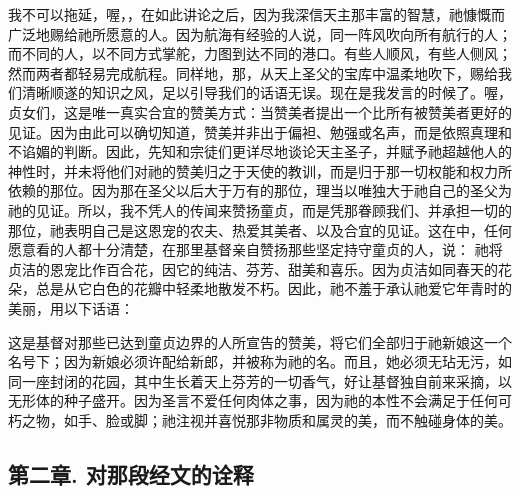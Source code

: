 我不可以拖延，喔，，在如此讲论之后，因为我深信天主那丰富的智慧，祂慷慨而广泛地赐给祂所愿意的人。因为航海有经验的人说，同一阵风吹向所有航行的人；而不同的人，以不同方式掌舵，力图到达不同的港口。有些人顺风，有些人侧风；然而两者都轻易完成航程。同样地，那，从天上圣父的宝库中温柔地吹下，赐给我们清晰顺遂的知识之风，足以引导我们的话语无误。现在是我发言的时候了。喔，贞女们，这是唯一真实合宜的赞美方式：当赞美者提出一个比所有被赞美者更好的见证。因为由此可以确切知道，赞美并非出于偏袒、勉强或名声，而是依照真理和不谄媚的判断。因此，先知和宗徒们更详尽地谈论天主圣子，并赋予祂超越他人的神性时，并未将他们对祂的赞美归之于天使的教训，而是归于那一切权能和权力所依赖的那位。因为那在圣父以后大于万有的那位，理当以唯独大于祂自己的圣父为祂的见证。所以，我不凭人的传闻来赞扬童贞，而是凭那眷顾我们、并承担一切的那位，祂表明自己是这恩宠的农夫、热爱其美者、以及合宜的见证。这在中，任何愿意看的人都十分清楚，在那里基督亲自赞扬那些坚定持守童贞的人，说：  祂将贞洁的恩宠比作百合花，因它的纯洁、芬芳、甜美和喜乐。因为贞洁如同春天的花朵，总是从它白色的花瓣中轻柔地散发不朽。因此，祂不羞于承认祂爱它年青时的美丽，用以下话语： \par

这是基督对那些已达到童贞边界的人所宣告的赞美，将它们全部归于祂新娘这一个名号下；因为新娘必须许配给新郎，并被称为祂的名。而且，她必须无玷无污，如同一座封闭的花园，其中生长着天上芬芳的一切香气，好让基督独自前来采摘，以无形体的种子盛开。因为圣言不爱任何肉体之事，因为祂的本性不会满足于任何可朽之物，如手、脸或脚；祂注视并喜悦那非物质和属灵的美，而不触碰身体的美。\par


\subsection{第二章. 对那段经文的诠释}

